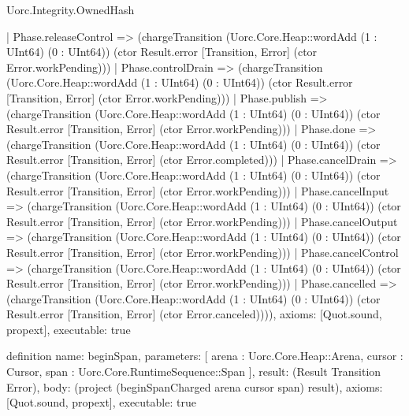 \begin{lexlean}{Uorc.Integrity.OwnedHash}
\begin{semanticmodule}
{    | Phase.releaseControl => (chargeTransition (Uorc.Core.Heap::wordAdd (1 : UInt64) (0 : UInt64)) (ctor Result.error [Transition, Error] (ctor Error.workPending)))
    | Phase.controlDrain => (chargeTransition (Uorc.Core.Heap::wordAdd (1 : UInt64) (0 : UInt64)) (ctor Result.error [Transition, Error] (ctor Error.workPending)))
    | Phase.publish => (chargeTransition (Uorc.Core.Heap::wordAdd (1 : UInt64) (0 : UInt64)) (ctor Result.error [Transition, Error] (ctor Error.workPending)))
    | Phase.done => (chargeTransition (Uorc.Core.Heap::wordAdd (1 : UInt64) (0 : UInt64)) (ctor Result.error [Transition, Error] (ctor Error.completed)))
    | Phase.cancelDrain => (chargeTransition (Uorc.Core.Heap::wordAdd (1 : UInt64) (0 : UInt64)) (ctor Result.error [Transition, Error] (ctor Error.workPending)))
    | Phase.cancelInput => (chargeTransition (Uorc.Core.Heap::wordAdd (1 : UInt64) (0 : UInt64)) (ctor Result.error [Transition, Error] (ctor Error.workPending)))
    | Phase.cancelOutput => (chargeTransition (Uorc.Core.Heap::wordAdd (1 : UInt64) (0 : UInt64)) (ctor Result.error [Transition, Error] (ctor Error.workPending)))
    | Phase.cancelControl => (chargeTransition (Uorc.Core.Heap::wordAdd (1 : UInt64) (0 : UInt64)) (ctor Result.error [Transition, Error] (ctor Error.workPending)))
    | Phase.cancelled => (chargeTransition (Uorc.Core.Heap::wordAdd (1 : UInt64) (0 : UInt64)) (ctor Result.error [Transition, Error] (ctor Error.canceled)))),
  axioms: [Quot.sound, propext],
  executable: true
}

definition{
  name: beginSpan,
  parameters: [
    arena : Uorc.Core.Heap::Arena,
    cursor : Cursor,
    span : Uorc.Core.RuntimeSequence::Span
  ],
  result: (Result Transition Error),
  body: (project (beginSpanCharged arena cursor span) result),
  axioms: [Quot.sound, propext],
  executable: true
}


\end{semanticmodule}
\end{lexlean}
